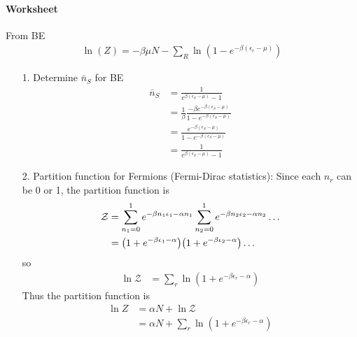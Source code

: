 \documentclass[../main.tex]{subfiles}
\begin{document}
\paragraph{Worksheet} From BE
\begin{align*}
    \ln (Z) = -\beta \mu N - \sum_R \ln(1 - e^{-\beta (\epsilon_r - \mu)})
\end{align*}
\begin{itemize}
    \item [1.] Determine $\bar n_S$ for BE
    \begin{align*}
        \bar n_S &= \frac{1}{e^{\beta (\epsilon_S - \mu)} - 1} \\
        &= \frac{1}{\beta} \frac{-\beta e^{-\beta (\epsilon_S - \mu)}}{1 - e^{-\beta (\epsilon_S - \mu)}} \\
        &= \frac{e^{-\beta (\epsilon_S - \mu)}}{1 - e^{-\beta (\epsilon_S - \mu)}} \\
        &= \frac{1}{e^{\beta (\epsilon_S - \mu)} - 1}
    \end{align*}
    \item [2.] Partition function for Fermions (Fermi-Dirac statistics):
    Since each $n_r$ can be 0 or 1, the partition function is
    \begin{align*}
        \mathcal{Z} &= \sum_{n_1 = 0}^1 e^{-\beta n_1 \epsilon_1 - \alpha n_1} \sum_{n_2 = 0}^1 e^{-\beta n_2 \epsilon_2 - \alpha n_2} \dots \\
        &= \qt(1 + e^{-\beta \epsilon_1 - \alpha}) \qt(1 + e^{-\beta \epsilon_2 - \alpha}) \dots
    \end{align*}
    so 
    \begin{align*}
        \ln\mathcal{Z} &= \sum_r \ln(1 + e^{-\beta \epsilon_r - \alpha})
    \end{align*}
    Thus the partition function is
    \begin{align*}
        \ln Z &= \alpha N + \ln \mathcal{Z} \\
        &= \alpha N + \sum_r \ln(1 + e^{-\beta \epsilon_r - \alpha})
    \end{align*}
\end{itemize}
\end{document}
